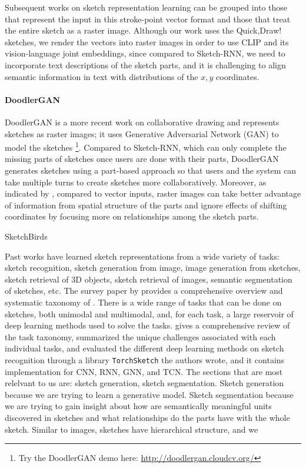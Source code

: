 Subsequent works on sketch representation learning can be grouped into those that represent the input in this stroke-point vector format and those that treat the entire sketch as a raster image. 
Although our work uses the Quick,Draw! sketches, we render the vectors into raster images in order to use CLIP and its vision-language joint embeddings, since compared to Sketch-RNN, we need to incorporate text descriptions of the sketch parts, and it is challenging to align semantic information in text with distributions of the $x,y$ coordinates. 

\paragraph{DoodlerGAN} 
DoodlerGAN \citep{doodlerGAN} is a more recent work on collaborative drawing and represents sketches as raster images; it uses Generative Adversarial Network (GAN) to model the sketches \footnote{Try the DoodlerGAN demo here: \url{http://doodlergan.cloudcv.org/}}. Compared to Sketch-RNN, which can only complete the missing parts of sketches once users are done with their parts, DoodlerGAN generates sketches using a part-based approach so that users and the system can take multiple turns to create sketches more collaboratively. 
Moreover, as indicated by \cite{doodlerGAN}, compared to vector inputs, raster images can take better advantage of information from spatial structure of the parts and ignore effects of shifting coordinates by focusing more on relationships among the sketch parts.   


SketchBirds

Past works have learned sketch representations from a wide variety of tasks: sketch recognition, sketch generation from image, image generation from sketches, sketch retrieval of 3D objects, sketch retrieval of images, semantic segmentation of sketches, etc. 
The survey paper by \citet{sketchsurvey} provides a comprehensive overview and systematic taxonomy of . 
There is a wide range of tasks that can be done on sketches, both unimodal and multimodal, and, for each task, a large reservoir of deep learning methods used to solve the tasks. 
\citet{sketchsurvey} gives a comprehensive review of the task taxonomy, summarized the unique challenges associated with each individual tasks, and evaluated the different deep learning methods on sketch recognition through a library \texttt{TorchSketch} the authors wrote, and it contains implementation for CNN, RNN, GNN, and TCN. The sections that are most relelvant to us are: sketch generation, sketch segmentation. Sketch generation because we are trying to learn a generative model. Sketch segmentation because we are trying to gain insight about how are semantically meaningful units discovered in sketches and what relationships do the parts have with the whole sketch.      
Similar to images, sketches have hierarchical structure, and we 

